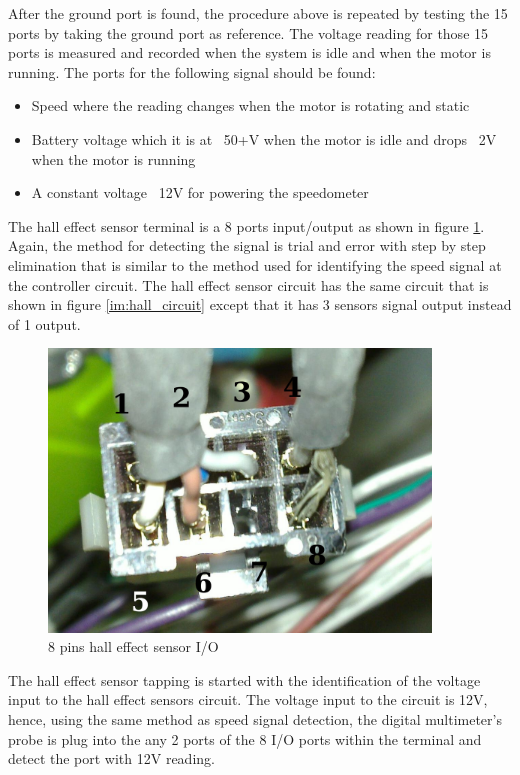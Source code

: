 After the ground port is found, the procedure above is repeated by testing the 15 ports by taking the ground port as reference. The voltage reading for those 15 ports is measured and recorded when the system is idle and when the motor is running. The ports for the following signal should be found:

\begin{itemize}
	\item{Speed where the reading changes when the motor is rotating and static}
	\item{Battery voltage which it is at ~50+V when the motor is idle and drops ~2V when the motor is running}
	\item{A constant voltage ~12V for powering the speedometer}
\end{itemize}

The hall effect sensor terminal is a 8 ports input/output as shown in figure \ref{im:hall8pin}. Again, the method for detecting the signal is trial and error with step by step elimination that is similar to the method used for identifying the speed signal at the controller circuit. The hall effect sensor circuit has the same circuit that is shown in figure \ref{im:hall_circuit} except that it has 3 sensors signal output instead of 1 output. 

\begin{figure} [htb]
	\centering
	\includegraphics[width=4in]{images/hall.jpg}
	\caption{8 pins hall effect sensor I/O}
	\label{im:hall8pin}
\end{figure}

The hall effect sensor tapping is started with the identification of the voltage input to the hall effect sensors circuit. The voltage input to the circuit is 12V, hence, using the same method as speed signal detection, the digital multimeter's probe is plug into the any 2 ports of the 8 I/O ports within the terminal and detect the port with 12V reading.

